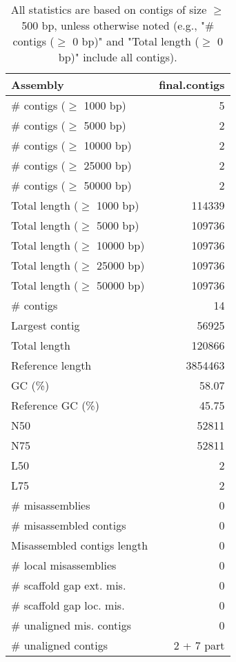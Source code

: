 \documentclass[12pt,a4paper]{article}
\begin{document}
\begin{table}[ht]
\begin{center}
\caption{All statistics are based on contigs of size $\geq$ 500 bp, unless otherwise noted (e.g., "\# contigs ($\geq$ 0 bp)" and "Total length ($\geq$ 0 bp)" include all contigs).}
\begin{tabular}{|l*{1}{|r}|}
\hline
Assembly & final.contigs \\ \hline
\# contigs ($\geq$ 1000 bp) & 5 \\ \hline
\# contigs ($\geq$ 5000 bp) & 2 \\ \hline
\# contigs ($\geq$ 10000 bp) & 2 \\ \hline
\# contigs ($\geq$ 25000 bp) & 2 \\ \hline
\# contigs ($\geq$ 50000 bp) & 2 \\ \hline
Total length ($\geq$ 1000 bp) & 114339 \\ \hline
Total length ($\geq$ 5000 bp) & 109736 \\ \hline
Total length ($\geq$ 10000 bp) & 109736 \\ \hline
Total length ($\geq$ 25000 bp) & 109736 \\ \hline
Total length ($\geq$ 50000 bp) & 109736 \\ \hline
\# contigs & 14 \\ \hline
Largest contig & 56925 \\ \hline
Total length & 120866 \\ \hline
Reference length & 3854463 \\ \hline
GC (\%) & 58.07 \\ \hline
Reference GC (\%) & 45.75 \\ \hline
N50 & 52811 \\ \hline
N75 & 52811 \\ \hline
L50 & 2 \\ \hline
L75 & 2 \\ \hline
\# misassemblies & 0 \\ \hline
\# misassembled contigs & 0 \\ \hline
Misassembled contigs length & 0 \\ \hline
\# local misassemblies & 0 \\ \hline
\# scaffold gap ext. mis. & 0 \\ \hline
\# scaffold gap loc. mis. & 0 \\ \hline
\# unaligned mis. contigs & 0 \\ \hline
\# unaligned contigs & 2 + 7 part \\ \hline

\end{tabular}
\end{center}
\end{table}
\end{document}
